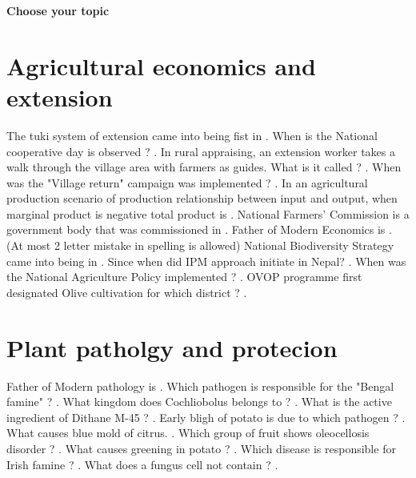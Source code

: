 \documentclass[10pt,a4paper,answers]{exam}
\begin{document}
\begin{center}
{\textbf {\LARGE Choose your topic}}
\end{center}

\section*{Agricultural economics and extension}

\begin{questions}
  \question The tuki system of extension came into being fist in \fillin[1977][3cm].
  \question When is the National cooperative day is observed ? \fillin[April 2nd][3cm].
  \question In rural appraising, an extension worker takes a walk through the village area with farmers as guides. What is it called ? \fillin[Transact][3cm].
  \question When was the "Village return" campaign was implemented ? \fillin[2024 BS][3cm].
  \question In an agricultural production scenario of production relationship between input and output, when marginal product is negative total product is \fillin[decreasing][3cm].
  \question National Farmers' Commission is a government body that was commissioned in \fillin[2073][3cm].
  \question Father of Modern Economics is . (At most 2 letter mistake in spelling is allowed)
  \question National Biodiversity Strategy came into being in \fillin[2059][2cm].
  \question Since when did IPM approach initiate in Nepal? \fillin[1997][3cm].
  \question When was the National Agriculture Policy implemented ? \fillin[2061 BS][3cm].
  \question OVOP programme first designated Olive cultivation for which district ? \fillin[Bajhang][3cm].
\end{questions}

\section*{Plant patholgy and protecion}

\begin{questions}
  \question Father of Modern pathology is .
  \question Which pathogen is responsible for the "Bengal famine" ? .
  \question What kingdom does Cochliobolus belongs to ? \fillin[Fungi][3cm].
  \question What is the active ingredient of Dithane M-45 ? \fillin[Mancozeb][3cm].
  \question Early bligh of potato is due to which pathogen ? .
  \question What causes blue mold of citrus. .
  \question Which group of fruit shows oleocellosis disorder ? \fillin[Citrus][3cm].
  \question What causes greening in potato ? \fillin[Solanine][3cm].
  \question Which disease is responsible for Irish famine ? .
  \question What does a fungus cell not contain ? \fillin[Chlorophyll][3cm].
\end{questions}
\end{document}
